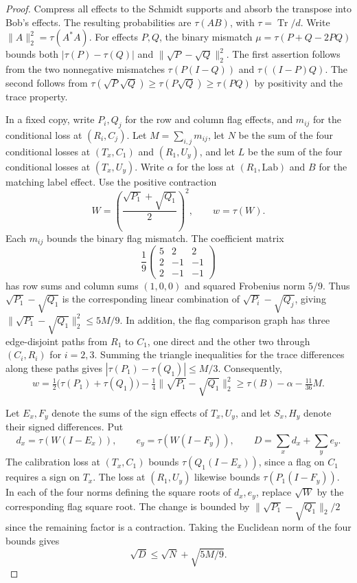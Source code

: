\begin{proof}
Compress all effects to the Schmidt supports and absorb the transpose into
Bob's effects. The resulting probabilities are $\tau(AB)$, with
$\tau=\operatorname{Tr}/d$. Write $\|A\|_2^2=\tau(A^*A)$. For effects $P,Q$,
the binary mismatch $\mu=\tau(P+Q-2PQ)$ bounds both
$|\tau(P)-\tau(Q)|$ and $\|\sqrt P-\sqrt Q\|_2^2$. The first assertion follows
from the two nonnegative mismatches $\tau(P(I-Q))$ and $\tau((I-P)Q)$.
The second follows from $\tau(\sqrt P\sqrt Q)\ge\tau(P\sqrt Q)\ge\tau(PQ)$
by positivity and the trace property.

In a fixed copy, write $P_i,Q_j$ for the row and column flag effects,
and $m_{ij}$ for the conditional loss at $(R_i,C_j)$. Let
$M=\sum_{i,j}m_{ij}$, let $N$ be the sum of the four conditional losses at
$(T_x,C_1)$ and $(R_1,U_y)$, and let $L$ be the sum of the four conditional
losses at $(T_x,U_y)$. Write $\alpha$ for the loss at $(R_1,\mathrm{Lab})$ and
$B$ for the matching label effect. Use the positive contraction
\[
 W=\left(\frac{\sqrt{P_1}+\sqrt{Q_1}}2\right)^2,
 \qquad w=\tau(W).
\]
Each $m_{ij}$ bounds the binary flag mismatch. The coefficient matrix
\[
 \frac19\begin{pmatrix}5&2&2\\2&-1&-1\\2&-1&-1\end{pmatrix}
\]
has row sums and column sums $(1,0,0)$ and squared Frobenius norm $5/9$.
Thus $\sqrt{P_1}-\sqrt{Q_1}$ is the corresponding linear combination of
$\sqrt{P_i}-\sqrt{Q_j}$, giving
$\|\sqrt{P_1}-\sqrt{Q_1}\|_2^2\le5M/9$. In addition, the flag comparison
graph has three edge-disjoint paths from $R_1$ to $C_1$, one direct and
the other two through $(C_i,R_i)$ for $i=2,3$. Summing the triangle
inequalities for the trace differences along these paths gives
$|\tau(P_1)-\tau(Q_1)|\le M/3$. Consequently,
\begin{equation}\label{eq:tracial-weight}
 w=\tfrac12\bigl(\tau(P_1)+\tau(Q_1)\bigr)
      -\tfrac14\|\sqrt{P_1}-\sqrt{Q_1}\|_2^2
 \ge\tau(B)-\alpha-\tfrac{11}{36}M.
\end{equation}

Let $E_x,F_y$ denote the sums of the sign effects of $T_x,U_y$, and let
$S_x,H_y$ denote their signed differences. Put
\[
 d_x=\tau(W(I-E_x)),\qquad e_y=\tau(W(I-F_y)),\qquad
 D=\sum_x d_x+\sum_y e_y.
\]
The calibration loss at $(T_x,C_1)$ bounds $\tau(Q_1(I-E_x))$, since a flag
on $C_1$ requires a sign on $T_x$. The loss at $(R_1,U_y)$ likewise bounds
$\tau(P_1(I-F_y))$. In each of the four norms defining the square roots of
$d_x,e_y$, replace $\sqrt W$ by the corresponding flag square root.
The change is bounded by $\|\sqrt{P_1}-\sqrt{Q_1}\|_2/2$ since the remaining
factor is a contraction. Taking the Euclidean norm of the four bounds gives
\begin{equation}\label{eq:tracial-deficits}
 \sqrt D\le\sqrt N+\sqrt{5M/9}.
\end{equation}


\end{proof}
